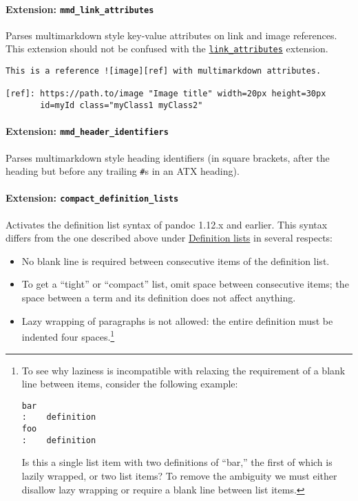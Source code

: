 \documentclass[
]{article}
\providecommand{\tightlist}{%
  \setlength{\itemsep}{0pt}\setlength{\parskip}{0pt}}
\begin{document}
\paragraph{\texorpdfstring{Extension:
\texttt{mmd\_link\_attributes}}{Extension: mmd\_link\_attributes}}\label{extension-mmd_link_attributes}

Parses multimarkdown style key-value attributes on link and image
references. This extension should not be confused with the
\hyperref[extension-link_attributes]{\texttt{link\_attributes}}
extension.

\begin{verbatim}
This is a reference ![image][ref] with multimarkdown attributes.

[ref]: https://path.to/image "Image title" width=20px height=30px
       id=myId class="myClass1 myClass2"
\end{verbatim}

\paragraph{\texorpdfstring{Extension:
\texttt{mmd\_header\_identifiers}}{Extension: mmd\_header\_identifiers}}\label{extension-mmd_header_identifiers}

Parses multimarkdown style heading identifiers (in square brackets,
after the heading but before any trailing \texttt{\#}s in an ATX
heading).

\paragraph{\texorpdfstring{Extension:
\texttt{compact\_definition\_lists}}{Extension: compact\_definition\_lists}}\label{extension-compact_definition_lists}

Activates the definition list syntax of pandoc 1.12.x and earlier. This
syntax differs from the one described above under
\hyperref[definition-lists]{Definition lists} in several respects:

\begin{itemize}
\tightlist
\item
  No blank line is required between consecutive items of the definition
  list.
\item
  To get a ``tight'' or ``compact'' list, omit space between consecutive
  items; the space between a term and its definition does not affect
  anything.
\item
  Lazy wrapping of paragraphs is not allowed: the entire definition must
  be indented four spaces.\footnote{To see why laziness is incompatible
    with relaxing the requirement of a blank line between items,
    consider the following example:

\begin{Verbatim}
bar
:    definition
foo
:    definition
\end{Verbatim}

    Is this a single list item with two definitions of ``bar,'' the
    first of which is lazily wrapped, or two list items? To remove the
    ambiguity we must either disallow lazy wrapping or require a blank
    line between list items.}
\end{itemize}
\end{document}

